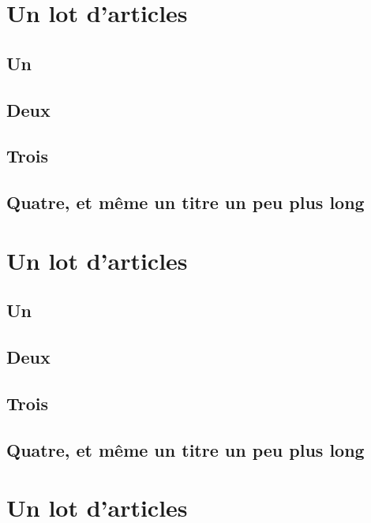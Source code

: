 \documentclass{book}
\begin{document}
\tableofcontents

\part{Un lot d'articles}

\chapter{Un}


\chapter{Deux}


\chapter{Trois}


\chapter{Quatre, et même un titre un peu plus long}



\part{Un lot d'articles}

\chapter{Un}


\chapter{Deux}


\chapter{Trois}


\chapter{Quatre, et même un titre un peu plus long}



\part{Un lot d'articles}
\end{document}

